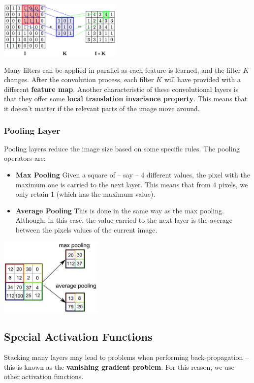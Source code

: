 \documentclass{article}
\begin{document}
\begin{center}
	\includegraphics[width=6cm]{assets/convolutional.png}
\end{center}
Many filters can be applied in parallel as each feature is learned, and the filter $K$ changes. After the convolution process, each filter $K$ will have provided with a different \textbf{feature map}. Another characteristic of these convolutional layers is that they offer some \textbf{local translation invariance property}. This means that it doesn't matter if the relevant parts of the image move around.

\subsubsection{Pooling Layer}
Pooling layers reduce the image size based on some specific rules. The pooling operators are:

\begin{itemize}
	\item \textbf{Max Pooling}
	Given a square of -- say -- 4 different values, the pixel with the maximum one is carried to the next layer. This means that from 4 pixels, we only retain 1 (which has the maximum value).
	
	\item \textbf{Average Pooling}
	This is done in the same way as the max pooling. Although, in this case, the value carried to the next layer is the average between the pixels values of the current image.
\end{itemize}

\begin{center}
	\includegraphics[width=5cm]{assets/pooling.png}
\end{center}

\subsection{Special Activation Functions}
Stacking many layers may lead to problems when performing back-propagation -- this is known as the \textbf{vanishing gradient problem}. For this reason, we use other activation functions.
\end{document}
